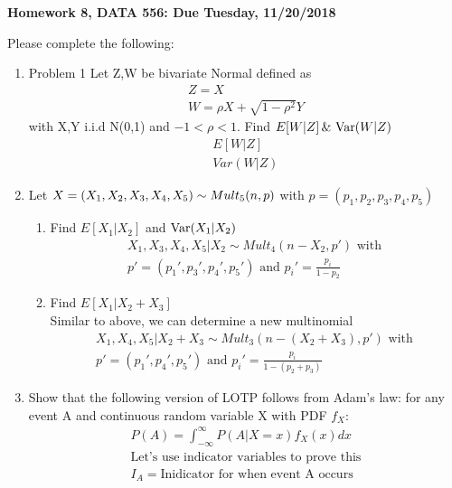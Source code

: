 \documentclass[11pt]{article}
\newcommand{\Var}{\mathop{\rm Var}}
\begin{document}
\begin{title}
	{\Large\bf Homework 8, DATA 556: Due Tuesday, 11/20/2018}
\end{title}

\author{\bf Alexander Van Roijen}

\maketitle

\newpage
Please complete the following:
\begin{enumerate}
\item Problem 1
Let Z,W be bivariate Normal defined as
\begin{gather}
	Z=X\\
	W=\rho X + \sqrt{1-\rho^2}Y
\end{gather}
with X,Y i.i.d N(0,1) and $-1<\rho<1$. Find $E[W|Z] \, \& \, \Var(W|Z)$
\begin{gather}
	E[W|Z] 
	\\
	Var(W|Z)
\end{gather}
\item Let $X = (X_1,X_2,X_3,X_4,X_5) \sim Mult_5(n,\boldmath{p})$ with $p = (p_1,p_2,p_3,p_4,p_5)$
\begin{enumerate}
	\item Find $E[X_1|X_2]$ and $\Var(X_1|X_2)$
	\begin{gather}
		X_1,X_3,X_4,X_5 | X_2 \sim Mult_4(n-X_2,p') \text{ with }\\
		p'=(p_1',p_3',p_4',p_5')\text{ and } p_i'= \frac{p_i}{1-p_2}
	\end{gather}
	\item Find $E[X_1|X_2+X_3]$ 
	\\
	Similar to above, we can determine a new multinomial
	\begin{gather}
		X_1,X_4,X_5 | X_2+X_3 \sim Mult_3(n-(X_2+X_3),p') \text{ with }\\
		p'=(p_1',p_4',p_5')\text{ and } p_i'= \frac{p_i}{1-(p_2+p_3)}
	\end{gather}
\end{enumerate}
\item Show that the following version of LOTP follows from Adam’s law: for any event A and continuous random variable X with PDF $f_X$:
\begin{gather}
	P(A) = \int_{-\infty}^{\infty}P(A|X=x)f_X(x)dx\\
	\text{Let's use indicator variables to prove this}\\
	I_A = \text{Inidicator for when event A occurs}\\

\end{gather}
\end{enumerate}
\end{document}
